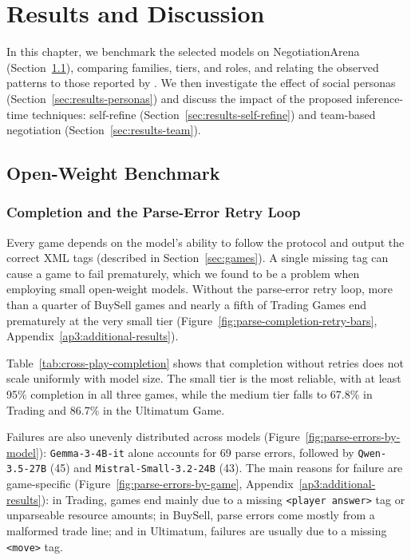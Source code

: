 \chapter{Results and Discussion} \label{chap:results}

In this chapter, we benchmark the selected models on NegotiationArena (Section~\ref{sec:results-benchmark}), comparing families, tiers, and roles, and relating the observed patterns to those reported by \textcite{bianchi_how_2024}. We then investigate the effect of social personas (Section~\ref{sec:results-personas}) and discuss the impact of the proposed inference-time techniques: self-refine (Section~\ref{sec:results-self-refine}) and team-based negotiation (Section~\ref{sec:results-team}).
 
\section{Open-Weight Benchmark} \label{sec:results-benchmark}

\subsection{Completion and the Parse-Error Retry Loop}

 
Every game depends on the model's ability to follow the protocol and output the correct XML tags (described in Section~\ref{sec:games}). A single missing tag can cause a game to fail prematurely, which we found to be a problem when employing small open-weight models. Without the parse-error retry loop, more than a quarter of BuySell games and nearly a fifth of Trading Games end prematurely at the very small tier (Figure~\ref{fig:parse-completion-retry-bars}, Appendix~\ref{ap3:additional-results}).

Table~\ref{tab:cross-play-completion} shows that completion without retries does not scale uniformly with model size. The small tier is the most reliable, with at least 95\% completion in all three games, while the medium tier falls to 67.8\% in Trading and 86.7\% in the Ultimatum Game.

Failures are also unevenly distributed across models (Figure~\ref{fig:parse-errors-by-model}): \texttt{Gemma-3-4B-it} alone accounts for 69 parse errors, followed by \texttt{Qwen-3.5-27B} (45) and \texttt{Mistral-Small-3.2-24B} (43). The main reasons for failure are game-specific (Figure~\ref{fig:parse-errors-by-game}, Appendix~\ref{ap3:additional-results}): in Trading, games end mainly due to a missing \texttt{<player answer>} tag or unparseable resource amounts; in BuySell, parse errors come mostly from a malformed trade line; and in Ultimatum, failures are usually due to a missing \texttt{<move>} tag.

